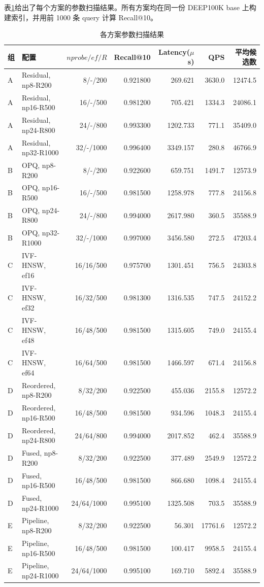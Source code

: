 \documentclass[a4paper]{article}
\begin{document}
表\ref{tab:advanced-results}给出了每个方案的参数扫描结果。所有方案均在同一份 DEEP100K base 上构建索引，并用前 1000 条 query 计算 Recall@10。
\begin{table}[H]
\centering
\scriptsize
\caption{各方案参数扫描结果}
\label{tab:advanced-results}
\begin{tabularx}{\textwidth}{llrrrrr}
\toprule
组 & 配置 & $nprobe/ef/R$ & Recall@10 & Latency($\mu$s) & QPS & 平均候选数 \\
\midrule
A & Residual, np8-R200 & 8/-/200 & 0.921800 & 269.621 & 3630.0 & 12474.5 \\
A & Residual, np16-R500 & 16/-/500 & 0.981200 & 705.421 & 1334.3 & 24086.1 \\
A & Residual, np24-R800 & 24/-/800 & 0.993300 & 1202.733 & 771.1 & 35409.0 \\
A & Residual, np32-R1000 & 32/-/1000 & 0.996400 & 3349.157 & 280.8 & 46766.9 \\
B & OPQ, np8-R200 & 8/-/200 & 0.922600 & 659.751 & 1491.7 & 12573.9 \\
B & OPQ, np16-R500 & 16/-/500 & 0.981500 & 1258.978 & 777.8 & 24156.8 \\
B & OPQ, np24-R800 & 24/-/800 & 0.994000 & 2617.980 & 360.5 & 35588.9 \\
B & OPQ, np32-R1000 & 32/-/1000 & 0.997000 & 3456.580 & 272.5 & 47203.4 \\
C & IVF-HNSW, ef16 & 16/16/500 & 0.975700 & 1301.451 & 756.5 & 24303.8 \\
C & IVF-HNSW, ef32 & 16/32/500 & 0.981300 & 1316.535 & 747.5 & 24152.2 \\
C & IVF-HNSW, ef48 & 16/48/500 & 0.981500 & 1315.605 & 749.0 & 24155.4 \\
C & IVF-HNSW, ef64 & 16/64/500 & 0.981500 & 1466.597 & 671.4 & 24156.8 \\
D & Reordered, np8-R200 & 8/32/200 & 0.922500 & 455.036 & 2155.8 & 12572.2 \\
D & Reordered, np16-R500 & 16/48/500 & 0.981500 & 934.596 & 1048.3 & 24155.4 \\
D & Reordered, np24-R800 & 24/64/800 & 0.994000 & 2017.852 & 462.4 & 35588.9 \\
D & Fused, np8-R200 & 8/32/200 & 0.922500 & 377.489 & 2549.9 & 12572.2 \\
D & Fused, np16-R500 & 16/48/500 & 0.981500 & 866.680 & 1098.4 & 24155.4 \\
D & Fused, np24-R1000 & 24/64/1000 & 0.995100 & 1325.508 & 703.5 & 35588.9 \\
E & Pipeline, np8-R200 & 8/32/200 & 0.922500 & 56.301 & 17761.6 & 12572.2 \\
E & Pipeline, np16-R500 & 16/48/500 & 0.981500 & 100.417 & 9958.5 & 24155.4 \\
E & Pipeline, np24-R1000 & 24/64/1000 & 0.995100 & 169.710 & 5892.4 & 35588.9 \\
\bottomrule
\end{tabularx}
\end{table}
\end{document}
